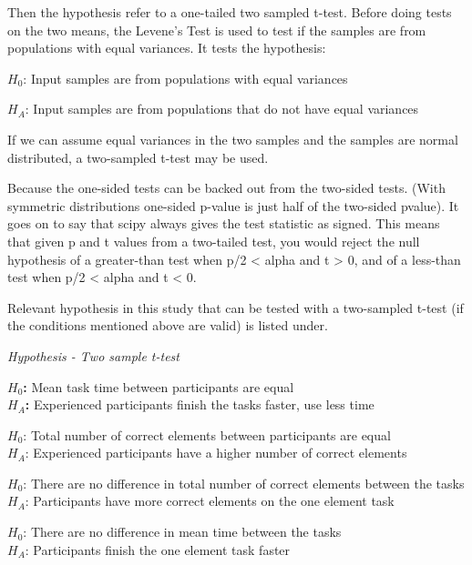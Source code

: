 Then the hypothesis refer to a one-tailed two sampled t-test. Before doing tests on the two means, the Levene's Test is used to test if the samples are from populations with equal variances. It tests the hypothesis:\newline %

\centerline{$H_{0}$: Input samples are from populations with equal variances} 
\centerline{$H_{A}$: Input samples are from populations that do not have equal variances}

If we can assume equal variances in the two samples and the samples are normal distributed, a two-sampled t-test may be used. 

Because the one-sided tests can be backed out from the two-sided tests. (With symmetric distributions one-sided p-value is just half of the two-sided pvalue). It goes on to say that scipy always gives the test statistic as signed. This means that given p and t values from a two-tailed test, you would reject the null hypothesis of a greater-than test when p/2 < alpha and t > 0, and of a less-than test when p/2 < alpha and t < 0. %

Relevant hypothesis in this study that can be tested with a two-sampled t-test (if the conditions mentioned above are valid) is listed under. \newline

\begin{framed}{\noindent\centering
		
		\textit{Hypothesis - Two sample t-test} \newline
		
		\textbf{$H_{0}$:} Mean task time between participants are equal\\
		\textbf{$H_{A}$:} Experienced participants finish the tasks faster, use less time\newline
		
		$H_{0}$: Total number of correct elements between participants are equal \\
		$H_{A}$: Experienced participants have a higher number of correct elements\newline
		
		$H_{0}$: There are no difference in total number of correct elements between the tasks\\
		$H_{A}$: Participants have more correct elements on the one element task\newline
		
		$H_{0}$: There are no difference in mean time between the tasks\\    
		$H_{A}$: Participants finish the one element task faster  %
		\par}
\end{framed}

